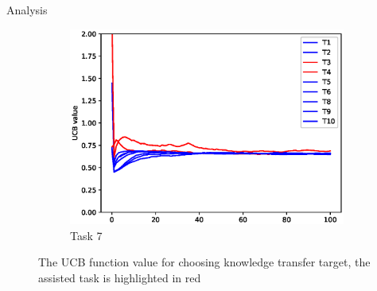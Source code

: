 \begin{frame}{Analysis}
\begin{figure}
\begin{subfigure}[b]{0.32\linewidth}
            \includegraphics[width=\linewidth]{figure/ucb/7.eps}
            \caption{Task 7}
        \end{subfigure}
        \caption{The UCB function value for choosing knowledge transfer target, the assisted task is highlighted in red}
    \end{figure}
\end{frame}
